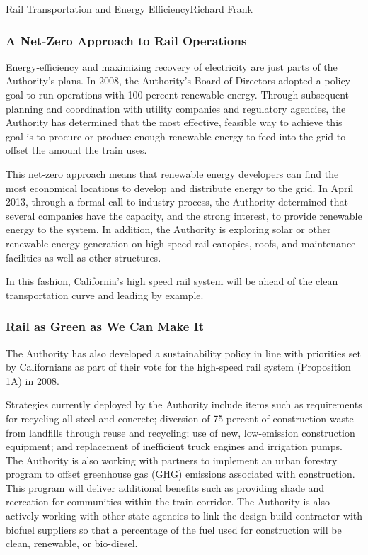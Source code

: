 \documentclass[10pt]{papertex}
\begin{document}
\begin{news}{2}{Rail Transportation and Energy Efficiency}{Richard Frank}{}{}
\subsubsection*{A Net-Zero Approach to Rail Operations}

Energy-efficiency and maximizing recovery of electricity are just parts of the 
Authority’s plans.  In 2008, the Authority’s Board of Directors adopted a 
policy goal to run operations with  100 percent renewable energy. Through 
subsequent planning and coordination with utility companies and regulatory 
agencies, the Authority has determined that the most effective, feasible way 
to achieve this goal is to procure or produce enough renewable energy to feed 
into the grid to offset the amount the train uses.

This net-zero approach means that renewable energy developers can find the 
most economical locations to develop and distribute energy to the grid.  In 
April 2013, through a formal call-to-industry process, the Authority determined 
that several companies have the capacity, and the strong interest, to provide 
renewable energy to the system.  In addition, the Authority is exploring solar 
or other renewable energy generation on high-speed rail canopies, roofs, and 
maintenance facilities as well as other structures.

In this fashion, California’s high speed rail system will be ahead of the 
clean transportation curve and leading by example.

\subsubsection*{Rail as Green as We Can Make It}

The Authority has also developed a sustainability policy in line with 
priorities set by Californians as part of their vote for the high-speed rail 
system (Proposition 1A) in 2008.

Strategies currently deployed by the Authority include items such as 
requirements  for recycling all steel and concrete; diversion of 75 percent 
of construction waste from landfills through reuse and recycling; use of new, 
low-emission construction equipment; and replacement of inefficient truck 
engines and irrigation pumps.  The Authority is also working with partners to 
implement an urban forestry program to offset greenhouse gas (GHG) emissions 
associated with construction.  This program will deliver additional benefits 
such as providing shade and recreation for communities within the train 
corridor. The Authority is also actively working with other state agencies to 
link the design-build contractor with biofuel suppliers so that a percentage of 
the fuel used for construction will be clean, renewable, or bio-diesel. 


\end{news}
\end{document}
